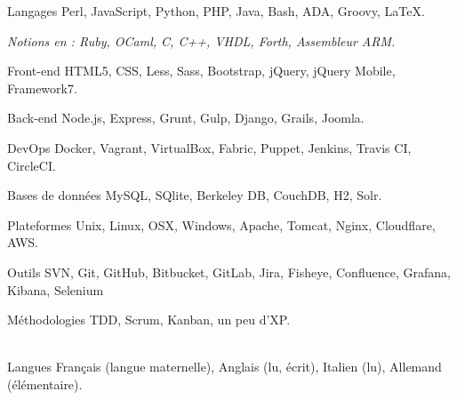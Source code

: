 
\begin{cvskills}

  \cvskill
    {Langages}
    {Perl, JavaScript, Python, PHP, Java, Bash, ADA, Groovy, LaTeX.}

  \cvskill
    {}
    {\textit{Notions en : Ruby, OCaml, C, C++, VHDL, Forth, Assembleur ARM.}}

  \cvskill
    {Front-end}
    {HTML5, CSS, Less, Sass, Bootstrap, jQuery, jQuery Mobile, Framework7.}

  \cvskill
    {Back-end}
    {Node.js, Express, Grunt, Gulp, Django, Grails, Joomla.}

  \cvskill
    {DevOps}
    {Docker, Vagrant, VirtualBox, Fabric, Puppet, Jenkins, Travis CI, CircleCI.}

  \cvskill
    {Bases de données}
    {MySQL, SQlite, Berkeley DB, CouchDB, H2, Solr.}

  \cvskill
    {Plateformes}
    {Unix, Linux, OSX, Windows, Apache, Tomcat, Nginx, Cloudflare, AWS.}

  \cvskill
    {Outils}
    {SVN, Git, GitHub, Bitbucket, GitLab, Jira, Fisheye, Confluence, Grafana, Kibana, Selenium}

  \cvskill
    {Méthodologies}
    {TDD, Scrum, Kanban, un peu d'XP.}

  \\
  \cvskill
    {Langues}
    {Français (langue maternelle), Anglais (lu, écrit), Italien (lu), Allemand (élémentaire).}

\end{cvskills}
